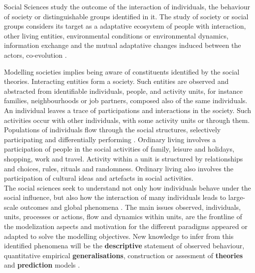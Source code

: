 \documentclass[11pt,oneside,a4paper,openright]{report}
\begin{document}




Social Sciences study the outcome of the interaction of individuals, the behaviour of society or distinguishable
groups identified in it. The study of society or social groups considers its target as a adaptative ecosystem of people with interaction, other living entities, environmental conditions or environmental dynamics, information
exchange and the mutual adaptative changes induced between the actors, co-evolution \cite{PerezAndBatten2006}.


Modelling societies implies being aware of constituents identified by the social theories. Interacting entities 
form a society. Such entities are observed and abstracted from identifiable individuals, people, and activity units, for instance families, neighbourhoods or job partners, composed also of the same individuals. 
An individual leaves a trace of participations and interactions in the society. Such activities occur with other
individuals, with some activity units or through them. Populations of individuals flow through the social structures, selectively participating and differentially performing \cite{GordonBurt2010}. 
Ordinary living involves a participation of people in the social activities of family, leisure and holidays, shopping, work and travel. Activity within a unit is structured by relationships and choices, rules, rituals and randomness. Ordinary living also involves the participation of cultural ideas and artefacts in social activities.\\
The social sciences seek to understand not only how individuals behave under the social influence, but also how the interaction of many individuals leads to large-scale outcomes and global phenomena \cite{GordonBurt2010}. 
The main issues observed, individuals, units, processes or actions, flow and dynamics within units, are the frontline of the modelization aspects and motivation for the different paradigms appeared or adapted to solve the modelling objectives. New knowledge to infer from this identified phenomena will be the \textbf{descriptive} statement of observed behaviour, quantitative empirical \textbf{generalisations}, construction or assesment of \textbf{theories} and \textbf{prediction} models \cite{Coleman1964}.
\end{document}
